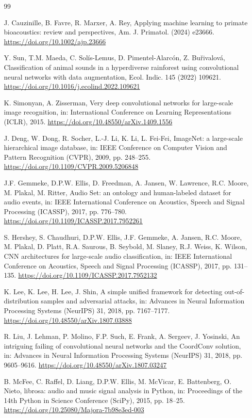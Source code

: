 \documentclass[final,3p,times]{elsarticle}
\begin{document}
\begin{thebibliography}{99}

J. Cauzinille, B. Favre, R. Marxer, A. Rey, Applying machine learning to
primate bioacoustics: review and perspectives, Am. J. Primatol. (2024) e23666.
\url{https://doi.org/10.1002/ajp.23666}

Y. Sun, T.M. Maeda, C. Sol\'is-Lemus, D. Pimentel-Alarc\'on, Z. Bu\v{r}ivalov\'a,
Classification of animal sounds in a hyperdiverse rainforest using convolutional
neural networks with data augmentation, Ecol. Indic. 145 (2022) 109621.
\url{https://doi.org/10.1016/j.ecolind.2022.109621}

K. Simonyan, A. Zisserman, Very deep convolutional networks for large-scale
image recognition, in: International Conference on Learning Representations
(ICLR), 2015. \url{https://doi.org/10.48550/arXiv.1409.1556}

J. Deng, W. Dong, R. Socher, L.-J. Li, K. Li, L. Fei-Fei, ImageNet: a
large-scale hierarchical image database, in: IEEE Conference on Computer
Vision and Pattern Recognition (CVPR), 2009, pp. 248--255.
\url{https://doi.org/10.1109/CVPR.2009.5206848}

J.F. Gemmeke, D.P.W. Ellis, D. Freedman, A. Jansen, W. Lawrence, R.C. Moore,
M. Plakal, M. Ritter, Audio Set: an ontology and human-labeled dataset for
audio events, in: IEEE International Conference on Acoustics, Speech and Signal
Processing (ICASSP), 2017, pp. 776--780.
\url{https://doi.org/10.1109/ICASSP.2017.7952261}

S. Hershey, S. Chaudhuri, D.P.W. Ellis, J.F. Gemmeke, A. Jansen, R.C. Moore,
M. Plakal, D. Platt, R.A. Saurous, B. Seybold, M. Slaney, R.J. Weiss,
K. Wilson, CNN architectures for large-scale audio classification, in: IEEE
International Conference on Acoustics, Speech and Signal Processing (ICASSP),
2017, pp. 131--135. \url{https://doi.org/10.1109/ICASSP.2017.7952132}

K. Lee, K. Lee, H. Lee, J. Shin, A simple unified framework for detecting
out-of-distribution samples and adversarial attacks, in: Advances in Neural
Information Processing Systems (NeurIPS) 31, 2018, pp. 7167--7177.
\url{https://doi.org/10.48550/arXiv.1807.03888}

R. Liu, J. Lehman, P. Molino, F.P. Such, E. Frank, A. Sergeev, J. Yosinski,
An intriguing failing of convolutional neural networks and the CoordConv
solution, in: Advances in Neural Information Processing Systems (NeurIPS) 31,
2018, pp. 9605--9616. \url{https://doi.org/10.48550/arXiv.1807.03247}

B. McFee, C. Raffel, D. Liang, D.P.W. Ellis, M. McVicar, E. Battenberg,
O. Nieto, librosa: audio and music signal analysis in Python, in: Proceedings
of the 14th Python in Science Conference (SciPy), 2015, pp. 18--25.
\url{https://doi.org/10.25080/Majora-7b98e3ed-003}

\end{thebibliography}
\end{document}
